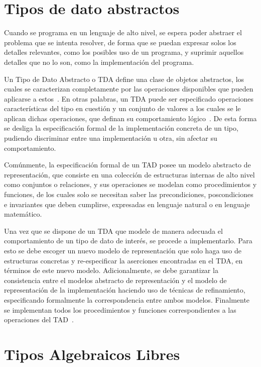 \section{Tipos de dato abstractos}

Cuando se programa en un lenguaje de alto nivel, se espera poder abstraer el
problema que se intenta resolver, de forma que se puedan expresar solos los
detalles relevantes, como los posibles uso de un programa, y suprimir aquellos
detalles que no lo son, como la implementación del programa.

Un Tipo de Dato Abstracto o TDA define una clase de objetos abstractos, los
cuales se caracterizan completamente por las operaciones disponibles que
pueden aplicarse a estos~\cite{liskov}. En otras palabras, un TDA puede ser
especificado operaciones características del tipo en cuestión y un conjunto de
valores a los cuales se le aplican dichas operaciones, que definan su
comportamiento lógico~\cite{dalewalker}. De esta forma se desliga la
especificación formal de la implementación concreta de un tipo, pudiendo
discriminar entre una implementación u otra, sin afectar su comportamiento.

Comúnmente, la especificación formal de un TAD posee un modelo abstracto de
representación, que consiste en una colección de estructuras internas de alto
nivel como conjuntos o relaciones, y sus operaciones se modelan como
procedimientos y funciones, de los cuales solo se necesitan saber las
precondiciones, poscondiciones e invariantes que deben cumplirse, expresadas
en lenguaje natural o en lenguaje matemático.

Una vez que se dispone de un TDA que modele de manera adecuada el
comportamiento de un tipo de dato de interés, se procede a implementarlo. Para
esto se debe escoger un nuevo modelo de representación que solo haga uso de
estructuras concretas y re-especificar la aserciones encontradas en el TDA, en
términos de este nuevo modelo. Adicionalmente, se debe garantizar la
consistencia entre el modelos abstracto de representación y el modelo de
representación de la implementación haciendo uso de técnicas de refinamiento,
especificando formalmente la correspondencia entre ambos modelos. Finalmente
se implementan todos los procedimientos y funciones correspondientes a las
operaciones del TAD~\cite{ravelo}.

\section{Tipos Algebraicos Libres}

